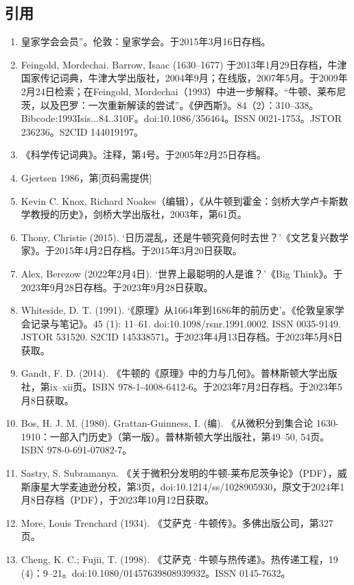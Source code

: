 \subsection{引用}  
\begin{enumerate}
\item 皇家学会会员”。伦敦：皇家学会。于2015年3月16日存档。  
\item Feingold, Mordechai. Barrow, Isaac (1630–1677) 于2013年1月29日存档，牛津国家传记词典，牛津大学出版社，2004年9月；在线版，2007年5月。于2009年2月24日检索；在Feingold, Mordechai（1993）中进一步解释。“牛顿、莱布尼茨，以及巴罗：一次重新解读的尝试”。《伊西斯》。84（2）：310–338。Bibcode:1993Isis...84..310F。doi:10.1086/356464。ISSN 0021-1753。JSTOR 236236。S2CID 144019197。
\item 《科学传记词典》。注释，第4号。于2005年2月25日存档。  
\item Gjertsen 1986，第[页码需提供]  
\item Kevin C. Knox, Richard Noakes（编辑），《从牛顿到霍金：剑桥大学卢卡斯数学教授的历史》，剑桥大学出版社，2003年，第61页。
\item Thony, Christie (2015). ‘日历混乱，还是牛顿究竟何时去世？’《文艺复兴数学家》。于2015年4月2日存档。于2015年3月20日获取。  
\item Alex, Berezow (2022年2月4日). ‘世界上最聪明的人是谁？’《Big Think》。于2023年9月28日存档。于2023年9月28日获取。  
\item Whiteside, D. T. (1991). ‘《原理》从1664年到1686年的前历史’。《伦敦皇家学会记录与笔记》。45 (1): 11–61. doi:10.1098/rsnr.1991.0002. ISSN 0035-9149. JSTOR 531520. S2CID 145338571。于2023年4月13日存档。于2023年5月8日获取。
\item Gandt, F. D. (2014). 《牛顿的《原理》中的力与几何》。普林斯顿大学出版社，第ix–xii页。ISBN 978-1-4008-6412-6。于2023年7月2日存档。于2023年5月8日获取。  
\item Bos, H. J. M. (1980). Grattan-Guinness, I. (编). 《从微积分到集合论 1630-1910：一部入门历史》（第一版）。普林斯顿大学出版社，第49–50, 54页。ISBN 978-0-691-07082-7。  
\item Sastry, S. Subramanya. 《关于微积分发明的牛顿-莱布尼茨争论》（PDF），威斯康星大学麦迪逊分校，第3页，doi:10.1214/ss/1028905930，原文于2024年1月8日存档（PDF），于2023年10月12日获取。  
\item More, Louis Trenchard (1934). 《艾萨克·牛顿传》。多佛出版公司，第327页。
\item Cheng, K. C.; Fujii, T. (1998). 《艾萨克·牛顿与热传递》。热传递工程，19 (4)：9–21。doi:10.1080/01457639808939932。ISSN 0145-7632。  

\end{enumerate}
